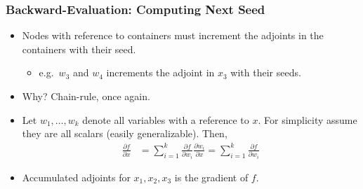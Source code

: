 \begin{frame}
\frametitle{Backward-Evaluation: Computing Next Seed}
\begin{itemize}

\item Nodes with reference to containers must increment
    the adjoints in the containers with their seed.
    \begin{itemize}
        \item e.g.\ $w_3$ and $w_4$ increments the adjoint in $x_3$ with their seeds.
    \end{itemize}

\item Why? Chain-rule, once again.

\item Let $w_1, \ldots, w_k$ denote all variables with a reference to $x$.
    For simplicity assume they are all scalars (easily generalizable).
    Then,
    \begin{align*}
        \frac{\partial f}{\partial x}
        &=  \sum\limits_{i=1}^k
            \frac{\partial f}{\partial w_{i}} \frac{\partial w_{i}}{\partial x}
        =   \sum\limits_{i=1}^k
            \frac{\partial f}{\partial w_{i}}
    \end{align*}

\item Accumulated adjoints for $x_1, x_2, x_3$ is the gradient of $f$.

\end{itemize}
\end{frame}

